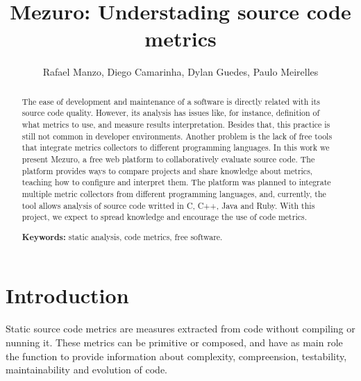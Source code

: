 \documentclass{llncs}
\begin{document}
\sloppy
\title{Mezuro: Understading source code metrics}

\author{Rafael Manzo, Diego Camarinha,
        Dylan Guedes, Paulo Meirelles}


\maketitle
\begin{abstract}
  The ease of development and maintenance of a software is directly related
with its source code quality.
  However, its analysis has issues like, for instance, definition of what
metrics to use, and measure results interpretation. Besides that, this practice
is still not common in developer environments. Another problem is the lack of
free tools that integrate metrics collectors to different programming languages.
In this work we present Mezuro, a free web platform to collaboratively evaluate
source code. The platform provides ways to compare projects and share knowledge
about metrics, teaching how to configure and interpret them. The platform was
planned to integrate multiple metric collectors from different programming
languages, and, currently, the tool allows analysis of source code writted in
C, C++, Java and Ruby.
    With this project, we expect to spread knowledge and encourage the use of
code metrics.

\textbf{Keywords:} static analysis, code metrics, free software.
\end{abstract}


\section{Introduction}
\label{sec:intro}

Static source code metrics are measures extracted from code without compiling
or nunning it. These metrics can be primitive or composed, and have as main
role the function to provide information about complexity, compreension,
testability, maintainability and evolution of code.
\end{document}
